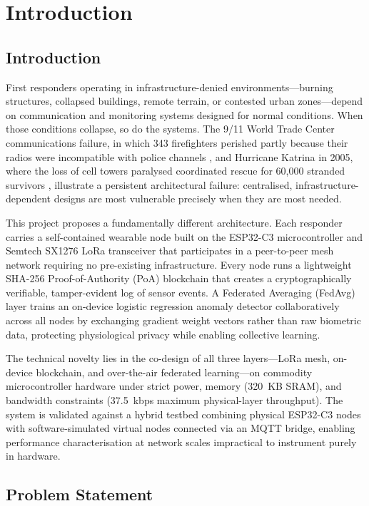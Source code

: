 \chapter{Introduction}

\section{Introduction}

First responders operating in infrastructure-denied environments—burning structures, collapsed buildings, remote terrain, or contested urban zones—depend on communication and monitoring systems designed for normal conditions. When those conditions collapse, so do the systems. The 9/11 World Trade Center communications failure, in which 343 firefighters perished partly because their radios were incompatible with police channels \cite{NIST_9_11_comms}, and Hurricane Katrina in 2005, where the loss of cell towers paralysed coordinated rescue for 60,000 stranded survivors \cite{AFCEA_Katrina_comms}, illustrate a persistent architectural failure: centralised, infrastructure-dependent designs are most vulnerable precisely when they are most needed.

This project proposes a fundamentally different architecture. Each responder carries a self-contained wearable node built on the ESP32-C3 microcontroller and Semtech SX1276 LoRa transceiver that participates in a peer-to-peer mesh network requiring no pre-existing infrastructure. Every node runs a lightweight SHA-256 Proof-of-Authority (PoA) blockchain that creates a cryptographically verifiable, tamper-evident log of sensor events. A Federated Averaging (FedAvg) layer trains an on-device logistic regression anomaly detector collaboratively across all nodes by exchanging gradient weight vectors rather than raw biometric data, protecting physiological privacy while enabling collective learning.

The technical novelty lies in the co-design of all three layers—LoRa mesh, on-device blockchain, and over-the-air federated learning—on commodity microcontroller hardware under strict power, memory (320~KB SRAM), and bandwidth constraints (37.5~kbps maximum physical-layer throughput). The system is validated against a hybrid testbed combining physical ESP32-C3 nodes with software-simulated virtual nodes connected via an MQTT bridge, enabling performance characterisation at network scales impractical to instrument purely in hardware.

\section{Problem Statement}

